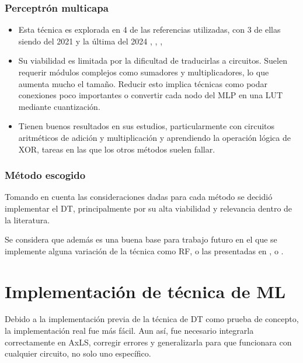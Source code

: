 \subsubsection{Perceptrón multicapa}

\begin{itemize}
    \item Esta técnica es explorada en 4 de las referencias utilizadas, con 3
      de ellas siendo del 2021 y la última del 2024
      \cite{boroumand_learning_2021}, \cite{miyasaka_logic_2021},
      \cite{rai_logic_2021}, \cite{prats_ramos_impact_2024}
    \item Su viabilidad es limitada por la dificultad de traducirlas a
      circuitos. Suelen requerir módulos complejos como sumadores y
      multiplicadores, lo que aumenta mucho el tamaño. Reducir esto implica
      técnicas como podar conexiones poco importantes o convertir cada nodo del
      MLP en una LUT mediante cuantización.
    \item Tienen buenos resultados en sus estudios, particularmente con
      circuitos aritméticos de adición y multiplicación y aprendiendo la
      operación lógica de XOR, tareas en las que los otros métodos suelen
      fallar.
\end{itemize}

\subsubsection{Método escogido}

Tomando en cuenta las consideraciones dadas para cada método se decidió
implementar el DT, principalmente por su alta viabilidad y relevancia dentro de
la literatura.

Se considera que además es una buena base para trabajo futuro en el que se implemente alguna variación de la técnica como RF, o las presentadas en \cite{hu_optdtals_2024}, \cite{zeng_sampling-based_2021} o \cite{huang_circuit_2023}.


\section{Implementación de técnica de ML}

Debido a la implementación previa de la técnica de DT como prueba de concepto,
la implementación real fue más fácil. Aun así, fue necesario integrarla
correctamente en AxLS, corregir errores y generalizarla para que funcionara con
cualquier circuito, no solo uno específico.

